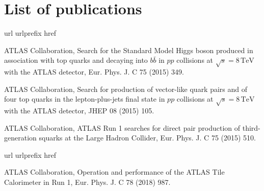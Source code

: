 \section{List of publications}

\begin{thebibliography}{10}
\makeatletter
\renewcommand\@biblabel[1]{}
\makeatother
\expandafter\ifx\csname url\endcsname\relax
  \def\url#1{\texttt{#1}}\fi
\expandafter\ifx\csname urlprefix\endcsname\relax\def\urlprefix{URL }\fi
\expandafter\ifx\csname href\endcsname\relax
  \def\href#1#2{#2} \def\path#1{#1}\fi

{ATLAS Collaboration}, {Search for the Standard Model Higgs boson produced in
  association with top quarks and decaying into \(b\bar{b}\) in \(pp\)
  collisions at \(\sqrt{s} = 8\,\text{TeV}\) with the ATLAS detector}, 
  \href {http://dx.doi.org/10.1140/epjc/s10052-015-3543-1}
  {Eur. Phys. J. C 75 (2015) 349}.


{ATLAS Collaboration}, {Search for production of vector-like quark pairs and of
  four top quarks in the lepton-plus-jets final state in \(pp\) collisions at
  \(\sqrt{s} = 8\,\text{TeV}\) with the ATLAS detector}, 
  \href {http://dx.doi.org/10.1007/JHEP08(2015)105}
  {JHEP 08 (2015) 105}.

{ATLAS Collaboration}, {ATLAS Run 1 searches for direct pair production of
  third-generation squarks at the Large Hadron Collider}, 
  \href {http://dx.doi.org/10.1140/epjc/s10052-015-3726-9}
  {Eur. Phys. J. C 75 (2015) 510}.
\end{thebibliography}


\begin{thebibliography}{10}
\makeatletter
\renewcommand\@biblabel[1]{}
\makeatother
\expandafter\ifx\csname url\endcsname\relax
  \def\url#1{\texttt{#1}}\fi
\expandafter\ifx\csname urlprefix\endcsname\relax\def\urlprefix{URL }\fi
\expandafter\ifx\csname href\endcsname\relax
  \def\href#1#2{#2} \def\path#1{#1}\fi

{ATLAS Collaboration}, {Operation and performance of the ATLAS Tile Calorimeter
  in Run 1},
  \href {http://dx.doi.org/10.1140/epjc/s10052-018-6374-z}
  {Eur. Phys. J. C 78 (2018) 987}.
  
\end{thebibliography}


